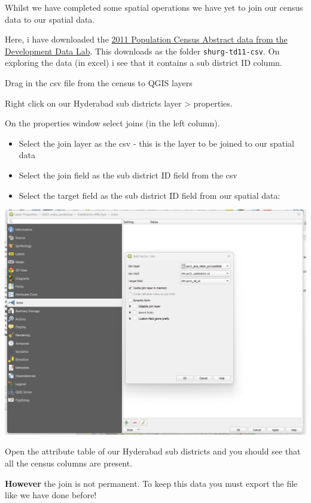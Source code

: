 \documentclass[
  letterpaper,
]{scrbook}
\begin{document}
Whilst we have completed some spatial operations we have yet to join our
census data to our spatial data.

Here, i have downloaded the
\href{https://www.devdatalab.org/shrug_download/}{2011 Population Census
Abstract data from the Development Data Lab}. This downloads as the
folder \texttt{shurg-td11-csv}. On exploring the data (in excel) i see
that it contains a sub district ID column.

Drag in the csv file from the census to QGIS layers

Right click on our Hyderabad sub districts layer \textgreater{}
properties.

On the properties window select joins (in the left column).

\begin{itemize}
\item
  Select the join layer as the csv - this is the layer to be joined to
  our spatial data
\item
  Select the join field as the sub district ID field from the csv
\item
  Select the target field as the sub district ID field from our spatial
  data:
\end{itemize}

\includegraphics{general_images/joins.png}

Open the attribute table of our Hyderabad sub districts and you should
see that all the census columns are present.

\begin{tcolorbox}[enhanced jigsaw, toprule=.15mm, colframe=quarto-callout-warning-color-frame, coltitle=black, left=2mm, rightrule=.15mm, breakable, bottomrule=.15mm, opacityback=0, bottomtitle=1mm, title=\textcolor{quarto-callout-warning-color}{\faExclamationTriangle}\hspace{0.5em}{Warning}, colbacktitle=quarto-callout-warning-color!10!white, titlerule=0mm, colback=white, toptitle=1mm, arc=.35mm, leftrule=.75mm, opacitybacktitle=0.6]

\textbf{However} the join is not permanent. To keep this data you must
export the file like we have done before!

\end{tcolorbox}
\end{document}
